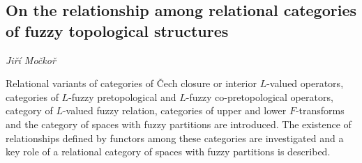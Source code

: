 \documentclass[../booklet.tex]{subfiles}
\begin{document}
\subsection[On the relationship among relational categories of fuzzy topological structures. {\it Jiří Močkoř}]{On the relationship among relational categories of fuzzy topological structures}

\begin{center}
  {\it Jiří Močkoř}
\end{center}

\vskip 0.8cm


	Relational variants of categories of \v Cech closure or interior $L$-valued operators, categories of $L$-fuzzy pretopological and $L$-fuzzy co-pretopological operators, category of $L$-valued fuzzy relation, categories of upper and lower $F$-transforms and the category of spaces with fuzzy partitions are introduced. The existence of relationships defined by functors among these categories are investigated and a key role of a relational category of spaces with fuzzy partitions is described.
\end{document}
